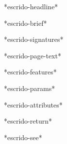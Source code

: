 *escrido-headline*

*escrido-brief*

*escrido-signatures*

*escrido-page-text*

*escrido-features*

*escrido-params*

*escrido-attributes*

*escrido-return*

*escrido-see*
